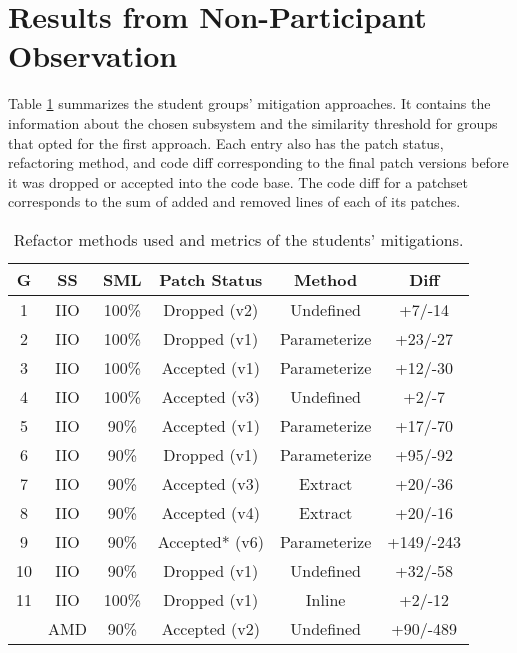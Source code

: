 \documentclass[10pt,conference]{IEEEtran}
\begin{document}
\section{Results from Non-Participant Observation}

Table \ref{tab:stu} summarizes the student groups' mitigation approaches. It contains the information about the chosen subsystem and the similarity threshold for groups that opted for the first approach. Each entry also has the patch status, refactoring method, and code diff corresponding to the final patch versions before it was dropped or accepted into the code base. The code diff for a patchset corresponds to the sum of added and removed lines of each of its patches.

\begin{table}
\centering
\caption{Refactor methods used and metrics of the students' mitigations.}
\begin{tabular}{ |c |c |c |c |c | c| }
\hline
\textbf{G} & \textbf{SS} & \textbf{SML} & \textbf{Patch Status} & \textbf{Method} & \textbf{Diff} \\
\hline

1 & IIO & 100\% & Dropped (v2) & Undefined & +7/-14 \\ \hline
2 & IIO & 100\% & Dropped (v1) & Parameterize & +23/-27 \\ \hline
3 & IIO & 100\% & Accepted (v1) & Parameterize & +12/-30 \\ \hline
4 & IIO & 100\% & Accepted (v3) & Undefined & +2/-7 \\ \hline
5 & IIO & 90\% & Accepted (v1) & Parameterize & +17/-70 \\ \hline
6 & IIO & 90\% & Dropped (v1) & Parameterize & +95/-92 \\ \hline
7 & IIO & 90\% & Accepted (v3) & Extract & +20/-36 \\ \hline
8 & IIO & 90\% & Accepted (v4) & Extract & +20/-16 \\ \hline
9 & IIO & 90\% & Accepted* (v6) & Parameterize & +149/-243 \\ \hline
10 & IIO & 90\% & Dropped (v1) & Undefined & +32/-58 \\ \hline
11 & IIO & 100\% & Dropped (v1) & Inline & +2/-12 \\ 
   & AMD & 90\% & Accepted (v2) & Undefined & +90/-489 \\ \hline

\end{tabular}%

\label{tab:stu}
\end{table}
\end{document}
